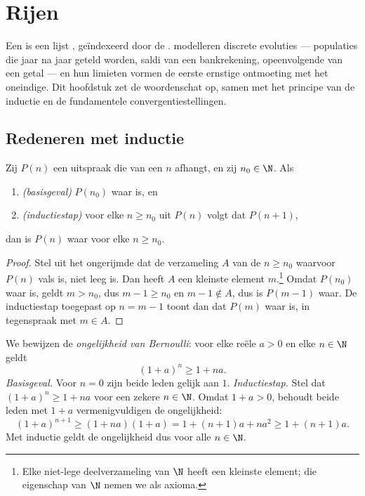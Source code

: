 \chapter{Rijen}\label{ch:g12:seq}

Een  is een lijst , geïndexeerd door de .
 modelleren discrete evoluties --- populaties die jaar na jaar geteld
worden, saldi van een bankrekening, opeenvolgende  van een getal
--- en hun limieten vormen de eerste ernstige ontmoeting met het oneindige.
Dit hoofdstuk zet de woordenschat op, samen met het principe van de inductie
en de fundamentele convergentiestellingen.

\section{Redeneren met inductie}

\begin{theorem}\label{thm:g12:seq:induction}
Zij $P(n)$ een uitspraak die van een  $n$ afhangt, en zij
$n_0 \in \N$. Als
\begin{enumerate}
  \item \emph{(basisgeval)} $P(n_0)$ waar is, en
  \item \emph{(inductiestap)} voor elke $n \geq n_0$ uit $P(n)$ volgt dat
        $P(n+1)$,
\end{enumerate}
dan is $P(n)$ waar voor elke $n \geq n_0$.
\end{theorem}

\begin{proof}
Stel uit het ongerijmde dat de verzameling $A$ van de 
$n \geq n_0$ waarvoor $P(n)$ vals is, niet leeg is. Dan heeft $A$ een kleinste
element $m$.\footnote{Elke niet-lege deelverzameling van $\N$ heeft een
kleinste element; die eigenschap van $\N$ nemen we als axioma.} Omdat
$P(n_0)$ waar is, geldt $m > n_0$, dus $m - 1 \geq n_0$ en $m-1 \notin A$,
dus is $P(m-1)$ waar. De inductiestap toegepast op $n = m-1$ toont dan dat
$P(m)$ waar is, in tegenspraak met $m \in A$.
\end{proof}

\begin{example}\label{ex:g12:seq:bernoulli}
We bewijzen de \emph{ongelijkheid van Bernoulli}: voor elke reële $a > 0$ en
elke $n \in \N$ geldt
\[
(1+a)^n \geq 1 + na.
\]
\emph{Basisgeval.} Voor $n = 0$ zijn beide leden gelijk aan $1$.
\emph{Inductiestap.} Stel dat $(1+a)^n \geq 1+na$ voor een zekere $n \in \N$.
Omdat $1 + a > 0$, behoudt beide leden met $1+a$ vermenigvuldigen de
ongelijkheid:
\[
(1+a)^{n+1} \geq (1+na)(1+a) = 1 + (n+1)a + na^2 \geq 1 + (n+1)a .
\]
Met inductie geldt de ongelijkheid dus voor alle $n \in \N$.
\end{example}

